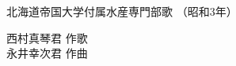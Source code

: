 \documentclass[10pt,b5j]{tarticle} %
\begin{document}
\begin{minipage}[c]{0.7\hsize} %
    \begin{center}
        {\LARGE
            北海道帝国大学付属水産専門部歌 %
        }
        {\small 
            （昭和3年） %
        }
    \end{center}
\end{minipage}
\begin{minipage}[c]{0.3\hsize} %
    \begin{flushright} %
        西村真琴君 作歌\\永井幸次君 作曲 %
    \end{flushright}
\end{minipage}
\end{document}
